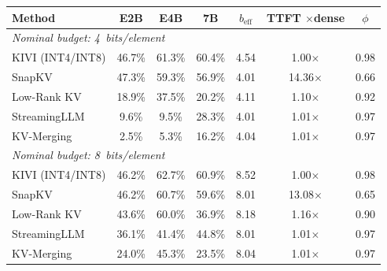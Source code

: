 \begin{tabular}{l ccc ccc}
\toprule
\textbf{Method} & \textbf{E2B} & \textbf{E4B} & \textbf{7B} & $b_{\text{eff}}$ & \textbf{TTFT $\times$dense} & $\phi$ \\
\midrule
\multicolumn{7}{l}{\textit{Nominal budget: 4~bits/element}} \\
\midrule
KIVI (INT4/INT8) & 46.7\% & 61.3\% & 60.4\% & 4.54 & 1.00$\times$ & 0.98 \\
SnapKV & 47.3\% & 59.3\% & 56.9\% & 4.01 & 14.36$\times$ & 0.66 \\
Low-Rank KV & 18.9\% & 37.5\% & 20.2\% & 4.11 & 1.10$\times$ & 0.92 \\
StreamingLLM & 9.6\% & 9.5\% & 28.3\% & 4.01 & 1.01$\times$ & 0.97 \\
KV-Merging & 2.5\% & 5.3\% & 16.2\% & 4.04 & 1.01$\times$ & 0.97 \\
\midrule
\multicolumn{7}{l}{\textit{Nominal budget: 8~bits/element}} \\
\midrule
KIVI (INT4/INT8) & 46.2\% & 62.7\% & 60.9\% & 8.52 & 1.00$\times$ & 0.98 \\
SnapKV & 46.2\% & 60.7\% & 59.6\% & 8.01 & 13.08$\times$ & 0.65 \\
Low-Rank KV & 43.6\% & 60.0\% & 36.9\% & 8.18 & 1.16$\times$ & 0.90 \\
StreamingLLM & 36.1\% & 41.4\% & 44.8\% & 8.01 & 1.01$\times$ & 0.97 \\
KV-Merging & 24.0\% & 45.3\% & 23.5\% & 8.04 & 1.01$\times$ & 0.97 \\
\bottomrule
\end{tabular}
